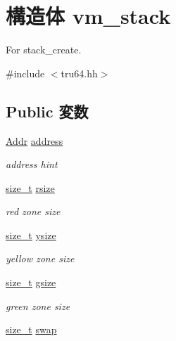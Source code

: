 \hypertarget{structTru64_1_1vm__stack}{
\section{構造体 vm\_\-stack}
\label{structTru64_1_1vm__stack}
}


For stack\_\-create.  


{\ttfamily \#include $<$tru64.hh$>$}\subsection*{Public 変数}
\begin{DoxyCompactItemize}
\item 
\hyperlink{base_2types_8hh_af1bb03d6a4ee096394a6749f0a169232}{Addr} \hyperlink{structTru64_1_1vm__stack_ab9fefac780347b9571641226e9db77c1}{address}
\begin{DoxyCompactList}\small\item\em address hint \item\end{DoxyCompactList}\item 
\hyperlink{classTru64_a186ea1339bffb378854987065835afe3}{size\_\-t} \hyperlink{structTru64_1_1vm__stack_aa915f6b06d95b6c4842464eb624a044e}{rsize}
\begin{DoxyCompactList}\small\item\em red zone size \item\end{DoxyCompactList}\item 
\hyperlink{classTru64_a186ea1339bffb378854987065835afe3}{size\_\-t} \hyperlink{structTru64_1_1vm__stack_aef0bffca6586c3e1489aba142b0a6771}{ysize}
\begin{DoxyCompactList}\small\item\em yellow zone size \item\end{DoxyCompactList}\item 
\hyperlink{classTru64_a186ea1339bffb378854987065835afe3}{size\_\-t} \hyperlink{structTru64_1_1vm__stack_af84708c92b04498d486cd4e33fe4243e}{gsize}
\begin{DoxyCompactList}\small\item\em green zone size \item\end{DoxyCompactList}\item 
\hyperlink{classTru64_a186ea1339bffb378854987065835afe3}{size\_\-t} \hyperlink{structTru64_1_1vm__stack_abb8ba4eaf2e820b8b06fcf18f3c95bd3}{swap}

\end{DoxyCompactItemize}
